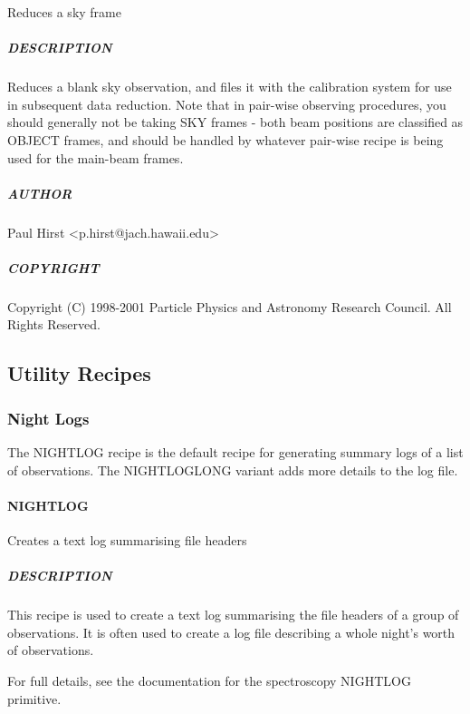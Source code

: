 \documentclass[twoside,11pt]{article}
\renewcommand{\_}{\texttt{\symbol{95}}}
\begin{document}
Reduces a sky frame

\subparagraph*{DESCRIPTION\label{REDUCE_SKY_DESCRIPTION}}

Reduces a blank sky observation, and files it with the calibration
system for use in subsequent data reduction. Note that in pair-wise
observing procedures, you should generally not be taking SKY frames -
both beam positions are classified as OBJECT frames, and should be
handled by whatever pair-wise recipe is being used for the main-beam
frames.

\subparagraph*{AUTHOR\label{REDUCE_SKY_AUTHOR}}

Paul Hirst <p.hirst@jach.hawaii.edu>

\subparagraph*{COPYRIGHT\label{REDUCE_SKY_COPYRIGHT}}

Copyright (C) 1998-2001 Particle Physics and Astronomy Research
Council. All Rights Reserved.


\subsection{Utility Recipes}

\subsubsection{Night Logs}

The NIGHT\_LOG recipe is the default recipe for generating summary
logs of a list of observations. The NIGHT\_LOG\_LONG variant adds more
details to the log file.

\paragraph*{NIGHT\_LOG\label{NIGHT_LOG}}

Creates a text log summarising file headers

\subparagraph*{DESCRIPTION\label{NIGHT_LOG_DESCRIPTION}}

This recipe is used to create a text log summarising the file headers
of a group of observations. It is often used to create a log file
describing a whole night's worth of observations.



For full details, see the documentation for the spectroscopy
\_NIGHT\_LOG primitive.
\end{document}
